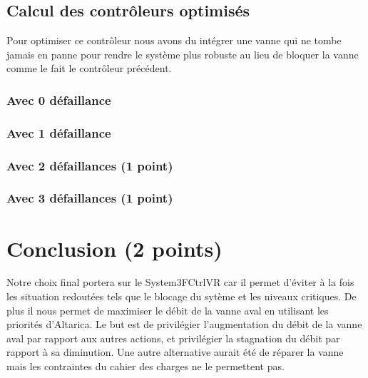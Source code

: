 \documentclass[a4paper]{book}
\begin{document}
\subsection{Calcul des contrôleurs optimisés }
Pour optimiser ce contrôleur nous avons du intégrer une vanne qui ne tombe jamais en panne pour rendre le système plus robuste au lieu de bloquer la vanne comme le fait le contrôleur précédent. 

\subsubsection{Avec 0 défaillance}






\subsubsection{Avec 1 défaillance }






\subsubsection{Avec 2 défaillances (1 point)}






\subsubsection{Avec 3 défaillances (1 point)}





\section{Conclusion (2 points)}
Notre choix final portera sur le System3FCtrlVR car il permet d'éviter à la fois les situation redoutées tels que le blocage du sytème et les niveaux critiques. De plus il nous permet de maximiser le débit de la vanne aval en utilisant les priorités d'Altarica. Le but est de privilégier l’augmentation du débit de la vanne aval par rapport aux autres actions, et privilégier la stagnation du débit par rapport à sa diminution.
 Une autre alternative aurait été de réparer la vanne mais les contraintes du cahier des charges ne le permettent pas. 
 
\end{document}
